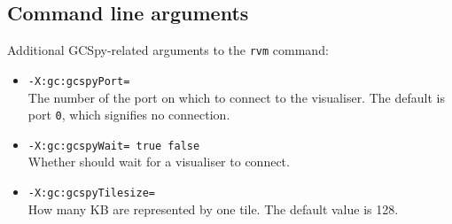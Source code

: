 \subsection{Command line arguments}

Additional GCSpy-related arguments to the \texttt{rvm} command:

\begin{itemize}

\item {\tt -X:gc:gcspyPort=} \\
    The number of the port on which to connect to the visualiser.  The
    default is port \texttt{0}, which signifies no connection. 

\item {\tt -X:gc:gcspyWait=\Mlbr{} \mbox{\texttt{true}} \Mor{} \mbox{\texttt{false}} \Mrbr} \\
    Whether \jrvm{} should wait for a visualiser to connect.

\item {\tt -X:gc:gcspyTilesize=} \\
    How many KB are represented by one tile.  The default value is 128.

\end{itemize}

